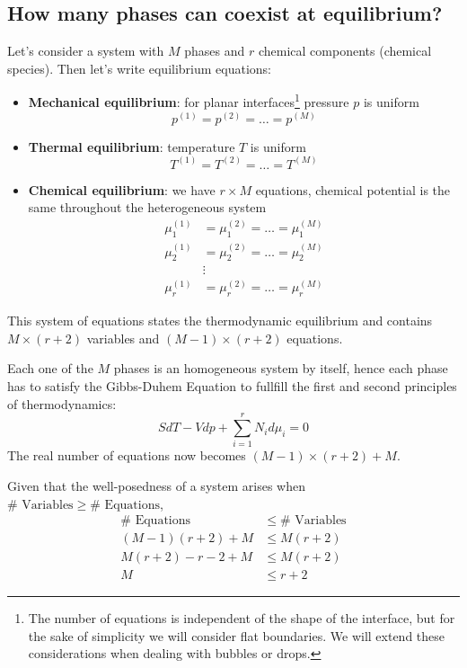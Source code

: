 \subsection{How many phases can coexist at equilibrium?}
Let's consider a system with $M$ phases and $r$ chemical components (chemical
species). Then let's write equilibrium equations:
\begin{itemize}
    \item \textbf{Mechanical equilibrium}: for planar interfaces\footnote{The
    number of equations is independent of the shape of the interface, but for
    the sake of simplicity we will consider flat boundaries. We will extend
    these considerations when dealing with bubbles or drops.} pressure $p$ is
    uniform
    \begin{equation*}
        p^{(1)} = p^{(2)} = \dots = p^{(M)}
    \end{equation*}
    \item \textbf{Thermal equilibrium}: temperature $T$ is uniform
    \begin{equation*}
        T^{(1)} = T^{(2)} = \dots = T^{(M)}
    \end{equation*}
    \item \textbf{Chemical equilibrium}: we have $r\times M$ equations, chemical
    potential is the same throughout the heterogeneous system
    \begin{align*}
        \mu_1^{(1)} &= \mu_1^{(2)} = \dots = \mu_1^{(M)} \\
        \mu_2^{(1)} &= \mu_2^{(2)} = \dots = \mu_2^{(M)} \\
        &\vdots \\
        \mu_r^{(1)} &= \mu_r^{(2)} = \dots = \mu_r^{(M)}
    \end{align*}
\end{itemize}

This system of equations states the thermodynamic equilibrium and contains
$M\times(r+2)$ variables and $(M-1)\times(r+2)$ equations.

Each one of the $M$ phases is an homogeneous system by itself, hence each phase
has to satisfy the Gibbs-Duhem Equation to fullfill the first and second
principles of thermodynamics:
\begin{equation*}
    SdT-Vdp+\sum_{i=1}^r N_id\mu_i = 0
\end{equation*}
The real number of equations now becomes $(M-1)\times(r+2) + M$.

Given that the well-posedness of a system arises when $\#\text{ Variables} \ge
\#\text{ Equations}$,
\begin{align*}
    \#\text{ Equations} &\le \#\text{ Variables} \\
    (M-1)(r+2)+M &\le M(r+2) \\
    M(r+2)-r-2+M &\le M(r+2) \\
    M &\le r+2
\end{align*}


